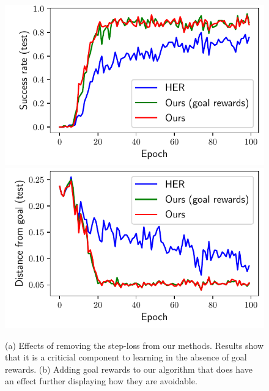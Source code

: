 \begin{figure}
\begin{minipage}[b]{0.5\linewidth}
    \includegraphics[width=\frac\columnwidth]{media/res/ablate-ours-with-goal-reward/FetchPickAndPlace-dqstepoch-test/success_rate.pdf}%
    \includegraphics[width=\frac\columnwidth]{media/res/ablate-ours-with-goal-reward/FetchPickAndPlace-dqstepoch-test/ag_g_dist.pdf}\\
    \label{fig:with-and-without-step-loss-b}
  \end{minipage}
  \caption{
      (a) Effects of removing the step-loss from our methods. Results
      show that it is a criticial component to learning in the absence
      of goal rewards.  
      (b) Adding goal rewards to our algorithm that does have an effect
      further displaying how they are avoidable. 
    }
  \label{fig:with-and-without-step-loss}%
\end{figure}%
% 

